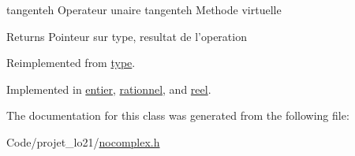 tangenteh Operateur unaire tangenteh Methode virtuelle 

\begin{DoxyReturn}{Returns}
Pointeur sur type, resultat de l'operation 
\end{DoxyReturn}


Reimplemented from \hyperlink{classtype_a36763dd363a8de97e4a52aa87776e61c}{type}.



Implemented in \hyperlink{classentier_abd47ffc368af385550ed2db6ce289ded}{entier}, \hyperlink{classrationnel_a56135a99618c1fec82901c5e7f64a4a2}{rationnel}, and \hyperlink{classreel_a00cb6cca23061d928135c074a5d69eb0}{reel}.



The documentation for this class was generated from the following file\-:\begin{DoxyCompactItemize}
\item 
Code/projet\-\_\-lo21/\hyperlink{nocomplex_8h}{nocomplex.\-h}\end{DoxyCompactItemize}
